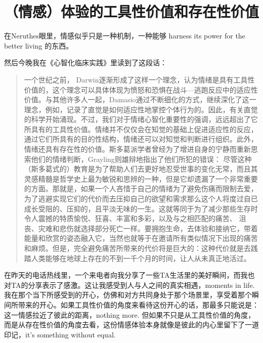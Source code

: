 \chapter{（情感）体验的工具性价值和存在性价值 }




在Neruthes眼里，情感似乎只是一种机制，一种能够 harness its power for the better living 的东西。

然后今晚我在《心智化临床实践》里读到了这段话：

\blockquote{
一个世纪之前， Darwin逐渐形成了这样一个理念，认为情绪是具有工具性价值的，这个理念可以具体体现为愤怒和恐惧在战斗—逃跑反应中的适应性价值。与其他许多人一起，Damasio通过不断细化的方式，继续深化了这一理念，例如，记录了直觉是如何适应性地掌控个体行为的。因此，有关直觉的科学开始涌现。不过，我们对于情绪心智化重要性的强调，远远超出了它所具有的工具性价值。情绪并不仅仅会在知觉的基础上促进适应性的反应，通过它们所具有的目的性结构，情绪还可以对知觉和判断进行组织。此外，情绪还具有存在性的价值。斯多葛派学者曾经为了增进自身的宁静而重新思索他们的情绪判断，Grayling则雄辩地指出了他们所犯的错误：
尽管这种（斯多葛式的）教育是为了帮助人们去更好地忍受世事的变化无常，而且其灵感精髓是哲学史上最为敏锐和思辨的一种，但是它却遗漏了一个非常重要的方面。那就是，如果一个人吝惜于自己的情绪为了避免伤痛而限制去爱，为了逃避实现它们的代价而去压抑自己的欲望和需求那么这个人将度过自已成长受阻的、压抑的，且平淡无味的一生。这就等同于为了减少那些生存时令人震撼的特质\pozhehao{}愉悦、狂喜、丰富和多彩，以及与之相匹配的痛苦、 沮丧、灾难和悲伤\pozhehao{}就选择部分死亡一样。要拥抱生命，去体验和接纳它，带着能量和欣赏的姿态融入它，当然也就等于在邀请所有类似情况下出现的痛苦和麻烦。但是，完全避免痛苦所带来的代价将是巨大的：这种代价就是去践踏人类能够在地球上存在的不到一千个月的时间，让人从未真正地活过。
}

在昨天的电话热线里，一个来电者向我分享了一些TA生活里的美好瞬间，而我也对TA的分享表示了感激。这让我感受到人与人之间的真实相遇，moments in life. 我在那个当下所感受到的开心，仿佛和对方共同身处于那个场景里，享受着那个瞬间所带来的开心。如果工具性价值的角度来看待这份开心的话，那最多只能说是：这一情感拉近了彼此的距离，nothing more. 但如果不只是从工具性价值的角度，而是从存在性价值的角度去看，这份情感体验本身就像是彼此的内心里留下了一道印记，it's something without equal.

